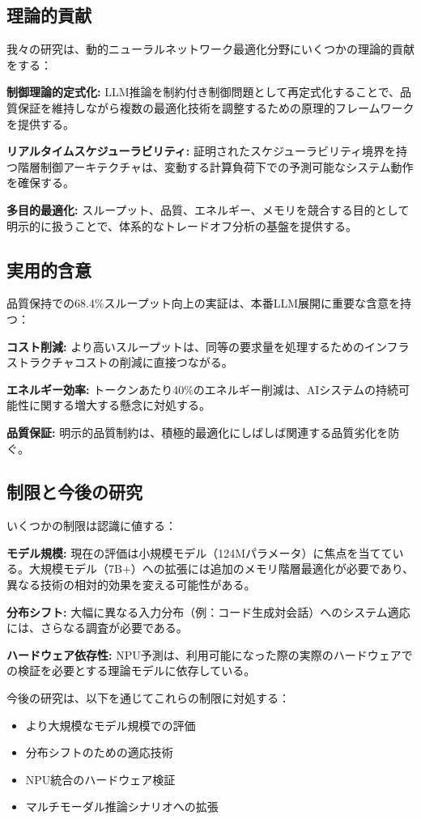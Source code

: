 \documentclass[10pt,twocolumn,a4paper]{jarticle}
\begin{document}
\subsection{理論的貢献}

我々の研究は、動的ニューラルネットワーク最適化分野にいくつかの理論的貢献をする：

\textbf{制御理論的定式化:} LLM推論を制約付き制御問題として再定式化することで、品質保証を維持しながら複数の最適化技術を調整するための原理的フレームワークを提供する。

\textbf{リアルタイムスケジューラビリティ:} 証明されたスケジューラビリティ境界を持つ階層制御アーキテクチャは、変動する計算負荷下での予測可能なシステム動作を確保する。

\textbf{多目的最適化:} スループット、品質、エネルギー、メモリを競合する目的として明示的に扱うことで、体系的なトレードオフ分析の基盤を提供する。

\subsection{実用的含意}

品質保持での68.4\%スループット向上の実証は、本番LLM展開に重要な含意を持つ：

\textbf{コスト削減:} より高いスループットは、同等の要求量を処理するためのインフラストラクチャコストの削減に直接つながる。

\textbf{エネルギー効率:} トークンあたり40\%のエネルギー削減は、AIシステムの持続可能性に関する増大する懸念に対処する。

\textbf{品質保証:} 明示的品質制約は、積極的最適化にしばしば関連する品質劣化を防ぐ。

\subsection{制限と今後の研究}

いくつかの制限は認識に値する：

\textbf{モデル規模:} 現在の評価は小規模モデル（124Mパラメータ）に焦点を当てている。大規模モデル（7B+）への拡張には追加のメモリ階層最適化が必要であり、異なる技術の相対的効果を変える可能性がある。

\textbf{分布シフト:} 大幅に異なる入力分布（例：コード生成対会話）へのシステム適応には、さらなる調査が必要である。

\textbf{ハードウェア依存性:} NPU予測は、利用可能になった際の実際のハードウェアでの検証を必要とする理論モデルに依存している。

今後の研究は、以下を通じてこれらの制限に対処する：
\begin{itemize}
\item より大規模なモデル規模での評価
\item 分布シフトのための適応技術
\item NPU統合のハードウェア検証
\item マルチモーダル推論シナリオへの拡張
\end{itemize}
\end{document}
